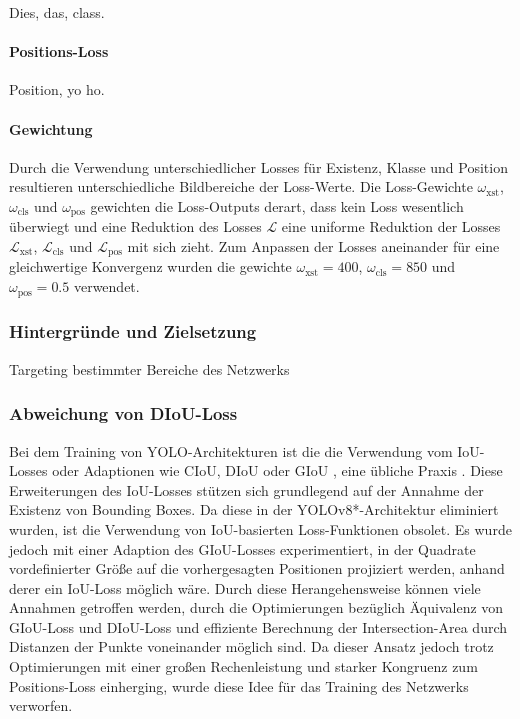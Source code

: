Dies, das, class.

\todo{}

\paragraph{Positions-Loss}

Position, yo ho.

\todo{}

\paragraph{Gewichtung}

Durch die Verwendung unterschiedlicher Losses für Existenz, Klasse und Position resultieren unterschiedliche Bildbereiche der Loss-Werte. Die Loss-Gewichte $\omega_\text{xst}$, $\omega_\text{cls}$ und $\omega_\text{pos}$ gewichten die Loss-Outputs derart, dass kein Loss wesentlich überwiegt und eine Reduktion des Losses $\mathcal{L}$ eine uniforme Reduktion der Losses $\mathcal{L}_\text{xst}$, $\mathcal{L}_\text{cls}$ und $\mathcal{L}_\text{pos}$ mit sich zieht. Zum Anpassen der Losses aneinander für eine gleichwertige Konvergenz wurden die gewichte $\omega_\text{xst} = 400$, $\omega_\text{cls} = 850$ und $\omega_\text{pos} = 0.5$ verwendet.

\subsubsection{Hintergründe und Zielsetzung}

Targeting bestimmter Bereiche des Netzwerks

\todo{}

\subsubsection{Abweichung von DIoU-Loss}

Bei dem Training von YOLO-Architekturen ist die die Verwendung vom IoU-Losses oder Adaptionen wie CIoU, DIoU oder GIoU \cite{diou_losses}, eine übliche Praxis \cite{yolov1,yolov8_paper,yolo_training_giou}. Diese Erweiterungen des IoU-Losses stützen sich grundlegend auf der Annahme der Existenz von Bounding Boxes. Da diese in der YOLOv8*-Architektur eliminiert wurden, ist die Verwendung von IoU-basierten Loss-Funktionen obsolet. Es wurde jedoch mit einer Adaption des GIoU-Losses experimentiert, in der Quadrate vordefinierter Größe auf die vorhergesagten Positionen projiziert werden, anhand derer ein IoU-Loss möglich wäre. Durch diese Herangehensweise können viele Annahmen getroffen werden, durch die Optimierungen bezüglich Äquivalenz von GIoU-Loss und DIoU-Loss und effiziente Berechnung der Intersection-Area durch Distanzen der Punkte voneinander möglich sind. Da dieser Ansatz jedoch trotz Optimierungen mit einer großen Rechenleistung und starker Kongruenz zum Positions-Loss einherging, wurde diese Idee für das Training des Netzwerks verworfen.

